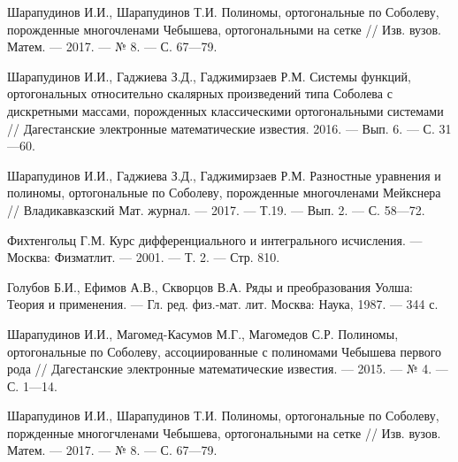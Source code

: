 \begin{thebibliography}{99}





Шарапудинов И.И., Шарапудинов Т.И. Полиномы, ортогональные по Соболеву, порожденные многочленами Чебышева, ортогональными на сетке // Изв. вузов. Матем. --- 2017. --- № 8. --- С. 67---79.







Шарапудинов И.И., Гаджиева З.Д., Гаджимирзаев Р.М. Системы функций, ортогональных относительно скалярных произведений типа Соболева с дискретными массами, порожденных классическими ортогональными системами // Дагестанские электронные математические известия. 2016. --- Вып. 6. --- С. 31---60.







Шарапудинов И.И., Гаджиева З.Д., Гаджимирзаев Р.М.
Разностные уравнения и полиномы, ортогональные по Соболеву, порожденные многочленами Мейкснера //
Владикавказский Мат. журнал. --- 2017. --- Т.19. --- Вып. 2. --- С. 58---72.







Фихтенгольц Г.М.
Курс дифференциального и интегрального исчисления. --- Москва: Физматлит. --- 2001. --- Т. 2. --- Стр. 810.







Голубов Б.И., Ефимов А.В., Скворцов В.А. Ряды и преобразования Уолша: Теория и применения. --- Гл. ред. физ.-мат. лит. Москва: Наука, 1987. --- 344 с.






Шарапудинов И.И., Магомед-Касумов М.Г., Магомедов С.Р. Полиномы, ортогональные по Соболеву, ассоциированные с полиномами Чебышева первого рода // Дагестанские электронные математические известия. --- 2015. --- № 4. --- С. 1---14.






Шарапудинов И.И., Шарапудинов Т.И. Полиномы, ортогональные по Соболеву, поржденные многогчленами Чебышева, ортогональными на сетке // Изв. вузов. Матем. --- 2017. --- № 8. --- С. 67---79.







\end{thebibliography}
